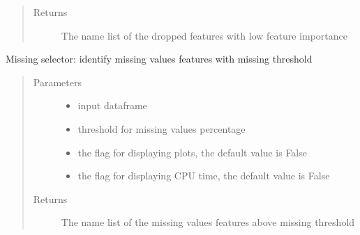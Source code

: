 \documentclass[letterpaper,11pt,english]{sphinxmanual}
\begin{document}
\begin{fulllineitems}
\begin{fulllineitems}
\begin{quote}
\begin{description}
\begin{itemize}
\end{itemize}

\item[{Returns}] \leavevmode
The name list of the dropped features with low feature importance

\end{description}\end{quote}

\end{fulllineitems}


\begin{fulllineitems}
\label{\detokenize{auto_feature:AutoFeatures.AutoFeatures.missing_selector}}
Missing selector: identify missing values features with missing threshold
\begin{quote}\begin{description}
\item[{Parameters}] \leavevmode\begin{itemize}
\item {} 
 \textendash{} input dataframe

\item {} 
 \textendash{} threshold for missing values percentage

\item {} 
 \textendash{} the flag for displaying plots, the default value is False

\item {} 
 \textendash{} the flag for displaying CPU time, the default value is False

\end{itemize}

\item[{Returns}] \leavevmode
The name list of the missing values features above missing threshold

\end{description}\end{quote}


\end{fulllineitems}
\end{fulllineitems}
\end{document}

